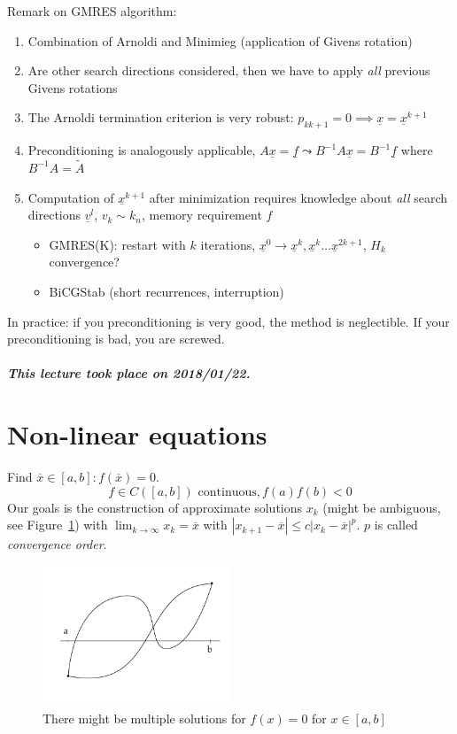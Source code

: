 \documentclass{article}
\newcommand{\card}[1]{\left|#1\right|}
\newcommand{\dateref}[1]{\paragraph{\textit{This lecture took place on #1.}}}
\begin{document}
Remark on GMRES algorithm:
\begin{enumerate}
  \item Combination of Arnoldi and Minimieg (application of Givens rotation)
  \item Are other search directions considered, then we have to apply \emph{all} previous Givens rotations
  \item The Arnoldi termination criterion is very robust: $p_{kk+1} = 0 \implies \underline x = \underline x^{k+1}$
  \item Preconditioning is analogously applicable, $A \underline x = \underline f \leadsto B^{-1} A \underline x = B^{-1} \underline f$ where $B^{-1} A = \tilde A$
  \item Computation of $\underline x^{k+1}$ after minimization requires knowledge about \emph{all} search directions $\underline v^l$, $v_k \sim k_n$, memory requirement $f$
    \begin{itemize}
      \item GMRES(K): restart with $k$ iterations, $\underline x^0 \to \underline x^k, \underline x^k \ldots \underline x^{2k+1}$, $H_k$ convergence?
      \item BiCGStab (short recurrences, interruption)
    \end{itemize}
\end{enumerate}

In practice: if you preconditioning is very good, the method is neglectible. If your preconditioning is bad, you are screwed.

\dateref{2018/01/22}

\section{Non-linear equations}  %

Find $\overline x \in [a,b]: f(\overline x) = 0$.
\[ f \in C([a,b]) \text{ continuous}, f(a) f(b) < 0 \]
Our goals is the construction of approximate solutions $x_k$ (might be ambiguous, see Figure~\ref{img:ambsol})
with $\lim_{k\to\infty} x_k = \overline x$ with $\card{x_{k+1} - \overline x} \leq c \card{x_k - \overline x}^p$.
$p$ is called \emph{convergence order}.

\begin{figure}[t]
  \begin{center}
    \includegraphics[width=0.5\textwidth]{img/11_ambiguous_solution.pdf}
    \caption{There might be multiple solutions for $f(x) = 0$ for $x \in [a,b]$}
    \label{img:ambsol}
  \end{center}
\end{figure}
\end{document}
